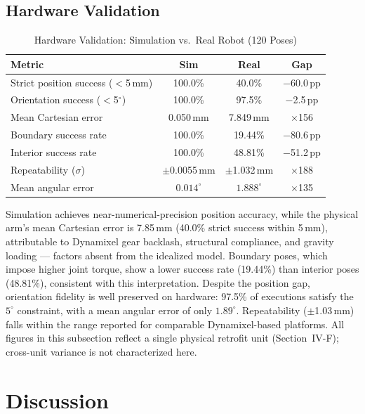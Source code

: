 \documentclass[conference]{IEEEtran}
\begin{document}
	\subsection{Hardware Validation}
	
	\begin{table}[t]
		\centering
		\caption{Hardware Validation: Simulation vs.\ Real Robot (120 Poses)}
		\label{tab:hw}
		\small
		\begin{tabular}{lccc}
			\toprule
			\textbf{Metric} & \textbf{Sim} & \textbf{Real} & \textbf{Gap} \\
			\midrule
			Strict position success ($<$5\,mm) & 100.0\% & 40.0\% & $-$60.0\,pp \\
			Orientation success ($<$5$^\circ$) & 100.0\% & 97.5\% & $-$2.5\,pp \\
			Mean Cartesian error & 0.050\,mm & 7.849\,mm & $\times$156 \\
			Boundary success rate & 100.0\% & 19.44\% & $-$80.6\,pp \\
			Interior success rate & 100.0\% & 48.81\% & $-$51.2\,pp \\
			Repeatability ($\sigma$) & $\pm$0.0055\,mm & $\pm$1.032\,mm & $\times$188 \\
			Mean angular error & $0.014^\circ$ & $1.888^\circ$ & $\times$135 \\
			\bottomrule
		\end{tabular}
	\end{table}
	
	Simulation achieves near-numerical-precision position accuracy, while
	the physical arm's mean Cartesian error is 7.85\,mm (40.0\% strict
	success within 5\,mm), attributable to Dynamixel gear backlash,
	structural compliance, and gravity loading — factors absent from the
	idealized model. Boundary poses, which impose higher joint torque,
	show a lower success rate (19.44\%) than interior poses (48.81\%),
	consistent with this interpretation. Despite the position gap,
	orientation fidelity is well preserved on hardware: 97.5\% of
	executions satisfy the $5^\circ$ constraint, with a mean angular
	error of only $1.89^\circ$. Repeatability ($\pm$1.03\,mm) falls
	within the range reported for comparable Dynamixel-based platforms.
	All figures in this subsection reflect a single physical retrofit
	unit (Section~IV-F); cross-unit variance is not characterized here.
	
	\section{Discussion}
	\label{sec:discussion}
	
\end{document}
